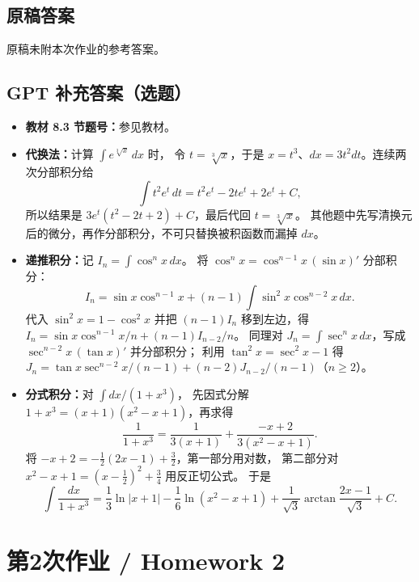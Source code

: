 \documentclass[UTF8,11pt, a4paper, oneside, fontset=none]{ctexbook}
\begin{document}
\subsection*{原稿答案}
\noindent 原稿未附本次作业的参考答案。
\clearpage
\subsection*{GPT 补充答案（选题）}
\begin{itemize}
\item \textbf{教材 8.3 节题号：}参见教材。
\item \textbf{代换法：}计算 $\int e^{\sqrt[3]x}\,dx$ 时，
令 $t=\sqrt[3]x$，于是 $x=t^3$、$dx=3t^2dt$。连续两次分部积分给
\[
\int t^2e^t\,dt=t^2e^t-2te^t+2e^t+C,
\]
所以结果是 $3e^t(t^2-2t+2)+C$，最后代回 $t=\sqrt[3]x$。
其他题中先写清换元后的微分，再作分部积分，不可只替换被积函数而漏掉 $dx$。
\item \textbf{递推积分：}记 $I_n=\int\cos^n x\,dx$。
将 $\cos^n x=\cos^{n-1}x\,(\sin x)'$ 分部积分：
\[
I_n=\sin x\cos^{n-1}x
+(n-1)\int\sin^2x\cos^{n-2}x\,dx.
\]
代入 $\sin^2x=1-\cos^2x$ 并把 $(n-1)I_n$ 移到左边，得
$I_n=\sin x\cos^{n-1}x/n+(n-1)I_{n-2}/n$。
同理对 $J_n=\int\sec^n x\,dx$，写成
$\sec^{n-2}x\,(\tan x)'$ 并分部积分；
利用 $\tan^2x=\sec^2x-1$ 得
$J_n=\tan x\sec^{n-2}x/(n-1)+(n-2)J_{n-2}/(n-1)$（$n\ge2$）。
\item \textbf{分式积分：}对 $\int dx/(1+x^3)$，
先因式分解 $1+x^3=(x+1)(x^2-x+1)$，再求得
\[
\frac1{1+x^3}=\frac1{3(x+1)}+\frac{-x+2}{3(x^2-x+1)}.
\]
将 $-x+2=-\tfrac12(2x-1)+\tfrac32$，第一部分用对数，
第二部分对 $x^2-x+1=(x-\tfrac12)^2+\tfrac34$ 用反正切公式。
于是
\[
\int\frac{dx}{1+x^3}
=\frac13\ln|x+1|-\frac16\ln(x^2-x+1)
+\frac1{\sqrt3}\arctan\frac{2x-1}{\sqrt3}+C.
\]
\end{itemize}
\clearpage
\section{第2次作业 / Homework 2}
\end{document}
